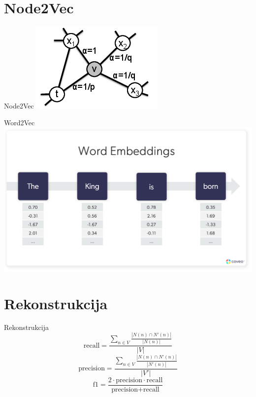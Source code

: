\documentclass{beamer}
\begin{document}
\section{Node2Vec}
\begin{frame}{Node2Vec}
    \includegraphics[width=\textwidth]{./png/walk.png}
\end{frame}

\begin{frame}{Word2Vec}
    \includegraphics[width=\textwidth]{./png/word2vec.png}
\end{frame}

\section{Rekonstrukcija}
\begin{frame}{Rekonstrukcija}
    $$ \text{recall} = \frac{\sum_{n \in V} \frac{|N(n) \cap N'(n)|}{|N(n)|}}{|V|} $$
    $$ \text{precision} = \frac{\sum_{n \in V} \frac{|N(n) \cap N'(n)|}{|N'(n)|}}{|V'|} $$
    $$ \text{f1} = \frac{2 \cdot \text{precision} \cdot \text{recall}}{\text{precision} + \text{recall}} $$
\end{frame}
\end{document}
